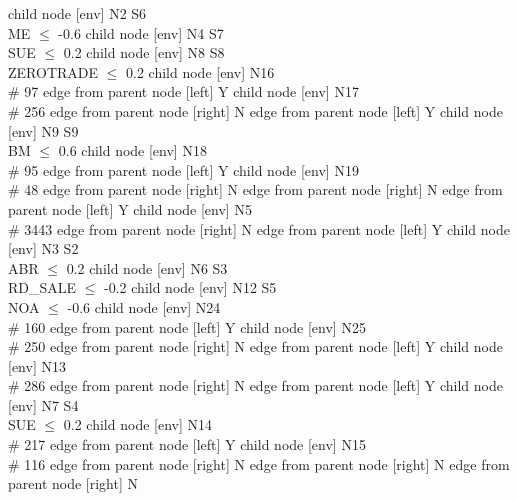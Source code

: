 
      child { node [env] {N2  S6 \\ ME $\leq$ -0.6} 
            child { node [env] {N4  S7 \\ SUE $\leq$ 0.2} 
                  child { node [env] {N8  S8 \\ ZEROTRADE $\leq$ 0.2} 
                        child { node [env] {N16   \\ \# 97 } 
                              edge from parent node [left] {Y} 
                        }
                        child { node [env] {N17   \\ \# 256 } 
                              edge from parent node [right] {N} 
                        }
                        edge from parent node [left] {Y} 
                  }
                  child { node [env] {N9  S9 \\ BM $\leq$ 0.6} 
                        child { node [env] {N18   \\ \# 95 } 
                              edge from parent node [left] {Y} 
                        }
                        child { node [env] {N19   \\ \# 48 } 
                              edge from parent node [right] {N} 
                        }
                        edge from parent node [right] {N} 
                  }
                  edge from parent node [left] {Y} 
            }
            child { node [env] {N5   \\ \# 3443 } 
                  edge from parent node [right] {N} 
            }
            edge from parent node [left] {Y} 
      }
      child { node [env] {N3  S2 \\ ABR $\leq$ 0.2} 
            child { node [env] {N6  S3 \\ RD\_SALE $\leq$ -0.2} 
                  child { node [env] {N12  S5 \\ NOA $\leq$ -0.6} 
                        child { node [env] {N24   \\ \# 160 } 
                              edge from parent node [left] {Y} 
                        }
                        child { node [env] {N25   \\ \# 250 } 
                              edge from parent node [right] {N} 
                        }
                        edge from parent node [left] {Y} 
                  }
                  child { node [env] {N13   \\ \# 286 } 
                        edge from parent node [right] {N} 
                  }
                  edge from parent node [left] {Y} 
            }
            child { node [env] {N7  S4 \\ SUE $\leq$ 0.2} 
                  child { node [env] {N14   \\ \# 217 } 
                        edge from parent node [left] {Y} 
                  }
                  child { node [env] {N15   \\ \# 116 } 
                        edge from parent node [right] {N} 
                  }
                  edge from parent node [right] {N} 
            }
            edge from parent node [right] {N} 
      }

